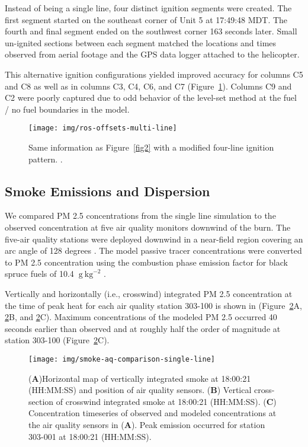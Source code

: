 \documentclass[preprints,article,accept,moreauthors,pdftex]{Definitions/mdpi}
\begin{document}
Instead of being a single line, four distinct ignition segments were created. The first segment started on the southeast corner of Unit 5 at 17:49:48 MDT. The fourth and final segment ended on the southwest corner 163 seconds later. Small un-ignited sections between each segment matched the locations and times observed from aerial footage and the GPS data logger attached to the helicopter.

This alternative ignition configurations yielded improved accuracy for columns C5 and C8 as well as in columns C3, C4, C6, and C7 (Figure~\ref{fig3}). Columns C9 and C2 were poorly captured due to odd behavior of the level-set method at the fuel / no fuel boundaries in the model.

\begin{figure}[H]
\centering
 \texttt{[image: img/ros-offsets-multi-line]}
 \caption{Same information as Figure~\ref{fig2} with a modified four-line ignition pattern. .\label{fig3}}
 \end{figure}

\subsection{Smoke Emissions and Dispersion}

We compared PM 2.5 concentrations from the single line simulation to the observed concentration at five air quality monitors downwind of the burn. The five-air quality stations were deployed downwind in a near-field region covering an arc angle of 128 degrees \cite{huda_study_2020}. The model passive tracer concentrations were converted to PM 2.5 concentration using the combustion phase emission factor for black spruce fuels of 10.4 $\mathrm{~g}\mathrm{~kg}^{-2}$ \cite{prichard_wildland_2020}.


Vertically and horizontally (i.e., crosswind) integrated PM 2.5 concentration at the time of peak heat for each air quality station 303-100 is shown in (Figure~\ref{fig4}A, \ref{fig4}B, and \ref{fig4}C). Maximum concentrations of the modeled PM 2.5 occurred 40 seconds earlier than observed and at roughly half the order of magnitude at station 303-100 (Figure~\ref{fig4}C).

\begin{figure}[H]
\centering
 \texttt{[image: img/smoke-aq-comparison-single-line]}
 \caption{(\textbf{A})Horizontal map of vertically integrated smoke at 18:00:21 (HH:MM:SS) and position of air quality sensors. (\textbf{B}) Vertical cross-section of crosswind integrated smoke at 18:00:21 (HH:MM:SS). (\textbf{C}) Concentration timeseries of observed and modeled concentrations at the air quality sensors in (\textbf{A}). Peak emission occurred for station 303-001 at 18:00:21 (HH:MM:SS).\label{fig4}}
 \end{figure}
\end{document}

